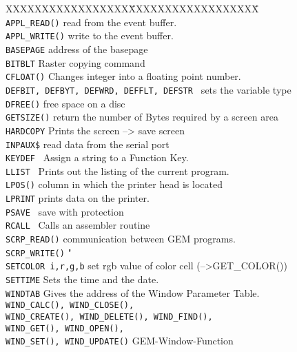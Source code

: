 \begin{tabbing}
XXXXXXXXXXXXXXXXX\=XXXXXXXXXXXXXXXXXX\=\kill\\
\verb|APPL_READ()|\>	read from the event buffer.\\
\verb|APPL_WRITE()|\>	write to the event buffer.\\
\verb|BASEPAGE|\>	address of the basepage\\
\verb|BITBLT|\>		Raster copying command\\
\verb|CFLOAT()|\>	Changes integer into a floating point number.\\
\verb|DEFBIT, DEFBYT, DEFWRD, DEFFLT, DEFSTR |\>  \>      sets the variable  type\\
\verb|DFREE()|\>		free space on a disc\\
\verb|GETSIZE()|\>	return the number of Bytes required by a screen area\\
\verb|HARDCOPY|\>       	Prints the screen          --> save screen\\
\verb|INPAUX$|\>        	read data from the serial port\\
\verb|KEYDEF |\>        	Assign a string to a Function Key.\\
\verb|LLIST |\>         	Prints out the listing of the current program.\\
\verb|LPOS()|\>         	column in which the printer head is located\\
\verb|LPRINT|\>         	prints data on the printer.\\
\verb|PSAVE |\>         	save with protection\\
\verb|RCALL |\>    	Calls an assembler routine\\
\verb|SCRP_READ()|\>   communication between GEM programs.\\
\verb|SCRP_WRITE()|\>   "\\
\verb|SETCOLOR i,r,g,b|\>  set rgb value of color cell (-->GET\_COLOR())\\
\verb|SETTIME|\>		Sets the time and the date.\\
\verb|WINDTAB|\>	       	Gives the address of the Window Parameter Table.\\
\verb|WIND_CALC(), WIND_CLOSE(),| \\
\verb|WIND_CREATE(), WIND_DELETE(), WIND_FIND(),| \\
\verb|WIND_GET(), WIND_OPEN(), | \\
\verb|WIND_SET(), WIND_UPDATE()|\> \> GEM-Window-Function\\
\end{tabbing}

